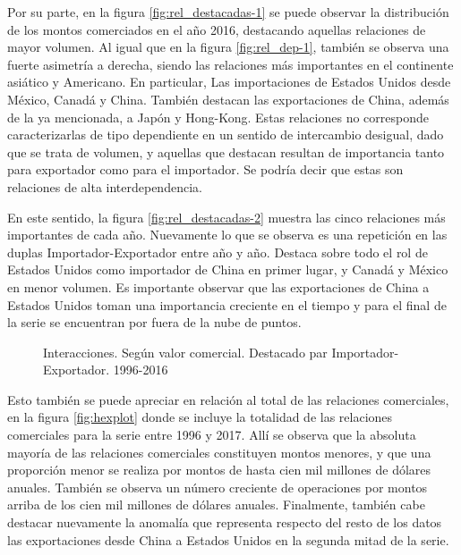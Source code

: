 \documentclass[class=article, crop=false]{standalone}
\begin{document}
Por su parte, en la figura \ref{fig:rel_destacadas-1} se puede observar la distribución de los montos comerciados en el año 2016, destacando aquellas relaciones de mayor volumen. Al igual que en la figura \ref{fig:rel_dep-1}, también se observa una fuerte asimetría a derecha, siendo las relaciones más importantes en el continente asiático y Americano. En particular, Las importaciones de Estados Unidos desde México, Canadá y China. También destacan las exportaciones de China, además de la ya mencionada, a Japón y Hong-Kong. Estas relaciones no corresponde caracterizarlas de tipo dependiente en un sentido de intercambio desigual, dado que se trata de volumen, y aquellas que destacan resultan de importancia tanto para exportador como para el importador. Se podría decir que estas son relaciones de alta interdependencia.

En este sentido, la figura \ref{fig:rel_destacadas-2} muestra las cinco relaciones más importantes de cada año. Nuevamente lo que se observa es una repetición en las duplas Importador-Exportador entre año y año. Destaca sobre todo el rol de Estados Unidos como importador de China en primer lugar, y Canadá y México en menor volumen. Es importante observar que las exportaciones de China a Estados Unidos toman una importancia creciente en el tiempo y para el final de la serie se encuentran por fuera de la nube de puntos. 


\begin{figure}
	\centering
	\caption{Interacciones. Según valor comercial. Destacado par Importador-Exportador. 1996-2016}
	\label{fig:rel_destacadas}
\end{figure}


Esto también se puede apreciar en relación al total de las relaciones comerciales, en la figura \ref{fig:hexplot} donde se incluye la totalidad de las relaciones comerciales para la serie entre 1996 y 2017. Allí se observa que la absoluta mayoría de las relaciones comerciales constituyen montos menores, y que una proporción menor se realiza por montos de hasta cien mil millones de dólares anuales. También se observa un número creciente de operaciones por montos arriba de los cien mil millones de dólares anuales. Finalmente, también cabe destacar nuevamente la anomalía que representa respecto del resto de los datos las exportaciones desde China a Estados Unidos en la segunda mitad de la serie.  
\end{document}
